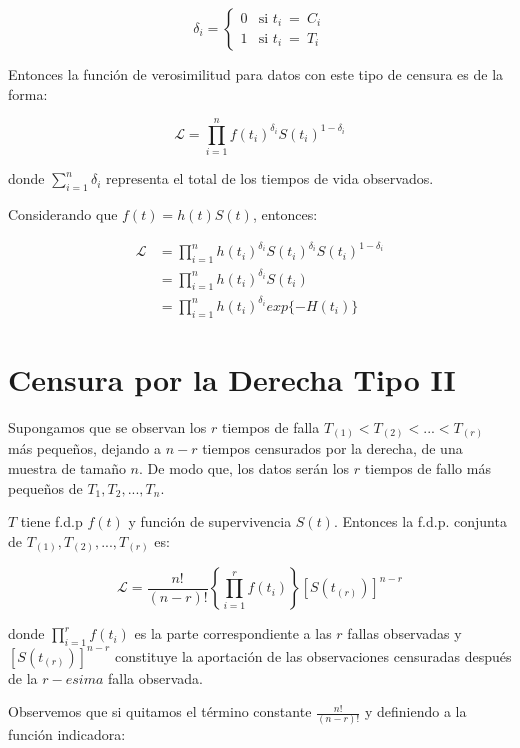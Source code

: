 \documentclass[
  a4paper,
  oneside,
  openany]{book}
\begin{document}
\[
\delta_{i} = \left\{
\begin{array}{ll}
0 & \mbox{si }  t_{i} \ = \ C_i\\
1 & \mbox{si }  t_{i} \ =\ T_i
\end{array}
\right.
\]

Entonces la función de verosimilitud para datos con este tipo de censura es de la forma:

\[ 
\mathscr{L} = \prod^{n}_{i=1}f(t_{i})^{\delta_{i}}S(t_{i})^{1-\delta_{i}} 
\]

donde \(\sum_{i=1}^{n}\delta_i\) representa el total de los tiempos de vida observados.

Considerando que \(f(t) = h(t) S(t)\), entonces:

\[
\begin{split}
\mathscr{L} & =\prod_{i = 1}^{n}h(t_{i})^{\delta_{i}}S(t_{i})^{\delta_{i}}S(t_{i})^{1-\delta_{i}}\\
 & =\prod_{i = 1}^{n}h(t_{i})^{\delta_{i}}S(t_{i})\\
 & =\prod_{i = 1}^{n}h(t_{i})^{\delta_{i}}exp\{-H(t_{i})\}
\end{split}
\]

\hypertarget{censura-por-la-derecha-tipo-ii-1}{%
\section{Censura por la Derecha Tipo II}\label{censura-por-la-derecha-tipo-ii-1}}

Supongamos que se observan los \(r\) tiempos de falla \(T_{(1)}< T_{(2)}< ...<T_{(r)}\) más pequeños, dejando a \(n-r\) tiempos censurados por la derecha, de una muestra de tamaño \(n\). De modo que, los datos serán los \(r\) tiempos de fallo más pequeños de \(T_{1}, T_{2},...,T_{n}\).

\(T\) tiene f.d.p \(f(t)\) y función de supervivencia \(S(t)\). Entonces la f.d.p. conjunta de \(T_{(1)}, T_{(2)}, ...,T_{(r)}\) es:

\[
\mathscr{L} = \frac{n!}{(n-r)!}\left\{\prod_{i=1}^{r}f(t_{i})\right\}\left[S\left(t_{(r)}\right)\right]^{n-r}
\]

donde \(\prod_{i=1}^{r}f(t_{i})\) es la parte correspondiente a las \(r\) fallas observadas y \([S(t_{(r)})]^{n-r}\) constituye la aportación de las observaciones censuradas después de la \(r-esima\) falla observada.

Observemos que si quitamos el término constante \(\frac{n!}{(n-r)!}\) y definiendo a la función indicadora:
\end{document}
